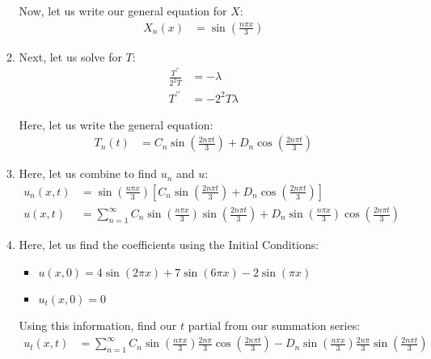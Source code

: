 \documentclass{article}
\begin{document}
\begin{enumerate}
\begin{enumerate}
     Now, let us write our general equation for $X$:
     \begin{align}
       X_n(x) & = \sin \left( \frac{n \pi x}{3} \right)
     \end{align}
     \item Next, let us solve for $T$:
     \begin{align}
       \frac{T^{\prime\prime}}{2^2T} & = -\lambda\\
       T^{\prime\prime} & = - 2^2 T \lambda
     \end{align}

     Here, let us write the general equation:
     \begin{align}
       T_n(t) & = C_n \sin\left( \frac{2 n \pi t}{3} \right) + D_n \cos \left( \frac{2 n \pi t}{3} \right)
     \end{align}

     \item Here, let us combine to find $u_n$ and $u$:
     \begin{align}
       u_n(x, t) & =
       \sin\left( \frac{n \pi x}{3} \right)
       \left[
       C_n \sin \left( \frac{2 n \pi t}{3} \right) +
       D_n \cos \left( \frac{2 n \pi t}{3} \right)
       \right]\\
       u(x, t) & =
       \sum^\infty_{n = 1}
       C_n
       \sin \left( \frac{n \pi x}{3} \right)
       \sin \left( \frac{2 n \pi t}{3} \right) +
       D_n
       \sin \left( \frac{n \pi x}{3} \right)
       \cos \left( \frac{2 n \pi t}{3} \right)
     \end{align}

     \item Here, let us find the coefficients using the Initial Conditions:
     \begin{itemize}
       \item
       $u(x, 0) =
       4 \sin ( 2 \pi x ) +
       7 \sin ( 6 \pi x ) -
       2 \sin( \pi x )$
       \item $u_t(x, 0) = 0$
     \end{itemize}

     Using this information, find our $t$ partial from our summation series:
     \begin{align}
       u_t(x, t) & =
       \sum^\infty_{n = 1}
       C_n
       \sin \left( \frac{n \pi x}{3} \right)
       \frac{2 n \pi}{3}
       \cos \left( \frac{2 n \pi t}{3} \right) -
       D_n
       \sin \left( \frac{n \pi x}{3} \right)
       \frac{2 n \pi}{3}
       \sin \left( \frac{2 n \pi t}{3} \right)
     \end{align}


\end{enumerate}
\end{enumerate}
\end{document}
